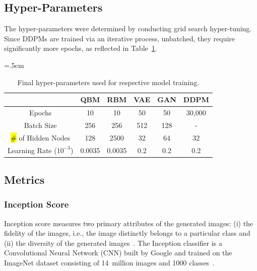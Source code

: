 \documentclass[technologies,article,accept,pdftex,moreauthors]{Definitions/mdpi}
\begin{document}
\subsection{Hyper-Parameters} 
The hyper-parameters were determined by conducting grid search hyper-tuning. Since DDPMs are trained via an iterative process, unbatched, they require significantly more epochs, as reflected in Table~\ref{tab:hyperparams}.

\begin{table}[H]
\caption{\label{tab:hyperparams}Final hyper-parameters used for respective model training.}
\tabcolsep=.5cm
\begin{tabular}{cccccc}
\toprule
& \textbf{QBM} & \textbf{RBM} & \textbf{VAE} & \textbf{GAN} & \textbf{DDPM}\\
\midrule
 Epochs & 10 & 10 & 50 & 50 & 30,000\\ 
 Batch Size & 256 & 256 & 512 & 128 & - \\ 
\hl{\#} %
 of Hidden Nodes & 128 & 2500 & 32 & 64 & 32 \\ 
 Learning Rate ($10^{-3}$) & 0.0035 & 0.0035 & 0.2 & 0.2 & 0.2\\
\bottomrule
\end{tabular}
\end{table}


\subsection{Metrics}
\label{metrics_}
\subsubsection{Inception Score}
Inception score measures two primary attributes of the generated images: (i) the fidelity of the images, i.e., the image distinctly belongs to a particular class and (ii) the diversity of the generated images~\cite{mack_2019}. The Inception classifier is a Convolutional Neural Network (CNN) built by Google and trained on the ImageNet dataset consisting of 14~million images and 1000 classes~\cite{inception_model}.
\end{document}
